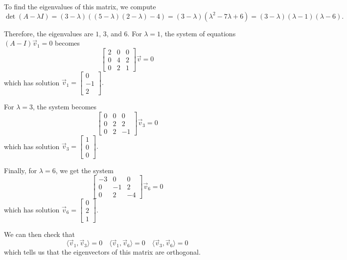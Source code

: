 \documentclass{ximera}
\begin{document}
\begin{exampleSol}
    To find the eigenvalues of this matrix, we compute
    \[ 
        \det(A - \lambda I) = (3-\lambda)\left( (5-\lambda)(2-\lambda) - 4\right) = (3-\lambda)(\lambda^2 - 7\lambda + 6) = (3-\lambda)(\lambda - 1)(\lambda - 6). 
    \]
    
    Therefore, the eigenvalues are $1$, $3$, and $6$. For $\lambda = 1$, the system of equations $(A - I) \vec{v}_1 = 0$ becomes
    \[ 
        \begin{bmatrix} 
            2 & 0 & 0 \\ 
            0 & 4 & 2 \\ 
            0 & 2 &1 
        \end{bmatrix}\vec{v} = 0 
    \] 
    which has solution 
    $\vec{v}_1 = \begin{bmatrix} 0 \\ -1 \\ 2 \end{bmatrix}.$
    
    For $\lambda = 3$, the system becomes
    \[ 
        \begin{bmatrix} 
            0 & 0 & 0 \\ 
            0 & 2 & 2 \\ 
            0 & 2 & -1 
        \end{bmatrix} \vec{v}_3 = 0 
    \] 
    which has solution 
    $\vec{v}_3 = \begin{bmatrix} 1 \\ 0 \\ 0 \end{bmatrix}.$
    
    Finally, for $\lambda = 6$, we get the system
    \[ 
        \begin{bmatrix} 
            -3 & 0 & 0 \\ 
            0 & -1 & 2 \\ 
            0 & 2 & -4 
        \end{bmatrix} \vec{v}_6 = 0 
    \] 
    which has solution 
    $\vec{v}_6 = \begin{bmatrix} 0 \\ 2 \\ 1 \end{bmatrix}.$
    
    We can then check that
    \[ 
        \langle \vec{v}_1, \vec{v}_3 \rangle = 0 \quad \langle \vec{v}_1, \vec{v}_6 \rangle = 0  \quad \langle \vec{v}_3, \vec{v}_6 \rangle = 0 
    \] 
    which tells us that the eigenvectors of this matrix are orthogonal. 
\end{exampleSol}
\end{document}
